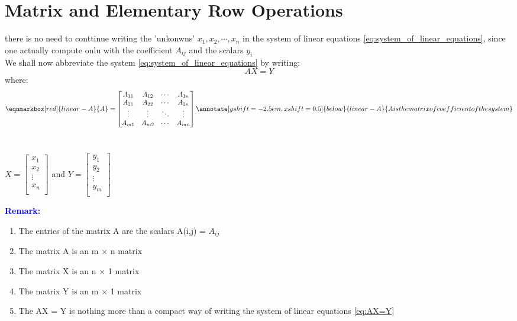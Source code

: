 \documentclass[11pt, a4paper, oneside,UTF8]{ctexbook}
\newenvironment{remark}
{\par\textcolor{blue}{\bfseries Remark:}\itshape}
{\par}
\newtheorem[M]{theorem}{Theorem}[section]
\newtheorem[M]{lemma}[theorem]{Lemma}
\newtheorem[M]{proposition}[theorem]{Proposition}
\newtheorem[M]{corollary}[theorem]{Corollary}
\newtheorem[M]{definition}{Definition}[section]
\begin{document}
\section{Matrix and Elementary Row Operations}
there is no need to conttinue writing the 'unkonwns' $x_1,x_2,\cdots,x_n$ in the system of linear equations \ref{eq:system_of_linear_equations},
since one actually compute onlu with the coefficient $A_{ij}$ and the scalars  $y_i$\\
We shall now abbreviate the system \ref{eq:system_of_linear_equations} by writing:
\[
	AX=Y
	\label{eq:AX=Y}
\]
where:
\begin{equation}
	\eqnmarkbox[red]{linear-A}{A} = \begin{bmatrix}
		A_{11} & A_{12} & \cdots & A_{1n} \\
		A_{21} & A_{22} & \cdots & A_{2n} \\
		\vdots & \vdots & \ddots & \vdots \\
		A_{m1} & A_{m2} & \cdots & A_{mn} \\
	\end{bmatrix}
	\annotate[yshift=-2.5em,xshift=0.5]{below}{linear-A}{A is the matrix of coefficient of the system}
	\label{eq:A equals}
\end{equation}
\\
\begin{center}


	$
		X = \begin{bmatrix}
			x_1    \\
			x_2    \\
			\vdots \\
			x_n    \\
		\end{bmatrix}
	$ \quad and \quad $
		Y = \begin{bmatrix}
			y_1    \\
			y_2    \\
			\vdots \\
			y_m    \\
		\end{bmatrix}
	$
\end{center}
\newpage
\begin{remark}
	\begin{enumerate}
		\item The entries of the matrix A are the scalars A(i,j) = $A_{ij}$
		\item The matrix A is an m $\times$ n matrix
		\item The matrix X is an n $\times$ 1 matrix
		\item The matrix Y is an m $\times$ 1 matrix
		\item The AX = Y is nothing more than a compact way of writing the system of linear equations
		      \ref{eq:AX=Y}
	\end{enumerate}
\end{remark}
\end{document}
